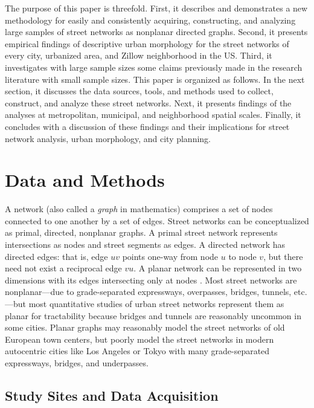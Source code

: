 \documentclass{article}
\begin{document}
The purpose of this paper is threefold. First, it describes and demonstrates a new methodology for easily and consistently acquiring, constructing, and analyzing large samples of street networks as nonplanar directed graphs. Second, it presents empirical findings of descriptive urban morphology for the street networks of every city, urbanized area, and Zillow neighborhood in the US. Third, it investigates with large sample sizes some claims previously made in the research literature with small sample sizes. This paper is organized as follows. In the next section, it discusses the data sources, tools, and methods used to collect, construct, and analyze these street networks. Next, it presents findings of the analyses at metropolitan, municipal, and neighborhood spatial scales. Finally, it concludes with a discussion of these findings and their implications for street network analysis, urban morphology, and city planning.



\section{Data and Methods}

A network (also called a \emph{graph} in mathematics) comprises a set of nodes connected to one another by a set of edges. Street networks can be conceptualized as primal, directed, nonplanar graphs. A primal street network represents intersections as nodes and street segments as edges. A directed network has directed edges: that is, edge $uv$ points one-way from node $u$ to node $v$, but there need not exist a reciprocal edge $vu$. A planar network can be represented in two dimensions with its edges intersecting only at nodes \cite{viana_simplicity_2013, fischer_spatial_2014}. Most street networks are nonplanar---due to grade-separated expressways, overpasses, bridges, tunnels, etc.---but most quantitative studies of urban street networks represent them as planar \cite{buhl_topological_2006, cardillo_structural_2006, barthelemy_modeling_2008, masucci_random_2009, strano_urban_2013} for tractability because bridges and tunnels are reasonably uncommon in some cities. Planar graphs may reasonably model the street networks of old European town centers, but poorly model the street networks in modern autocentric cities like Los Angeles or Tokyo with many grade-separated expressways, bridges, and underpasses.

\subsection{Study Sites and Data Acquisition}
\end{document}
